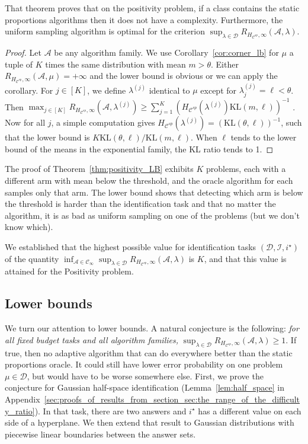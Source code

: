 \documentclass{article}
\newcommand{\KL}{\mathrm{KL}}
\begin{document}
That theorem proves that on the positivity problem, if a class contains the static proportions algorithms then it does not have a complexity. Furthermore, the uniform sampling algorithm is optimal for the criterion $\sup_{\lambda \in \mathcal D} R_{H_{\mathcal C^{sp}}, \infty}(\mathcal A, \lambda)$.

\begin{proof}
Let $\mathcal A$ be any algorithm family.
We use Corollary~\ref{cor:corner_lb} for $\mu$ a tuple of $K$ times the same distribution with mean $m > \theta$.
Either $R_{H_{\mathcal C^{sp}}, \infty}(\mathcal A, \mu) = + \infty$ and the lower bound is obvious or we can apply the corollary.
For $j \in [K]$, we define $\lambda^{(j)}$ identical to $\mu$ except for $\lambda^{(j)}_j = \ell < \theta$. Then
$
\max_{j \in [K]} R_{H_{\mathcal C^{sp}}, \infty}(\mathcal A, \lambda^{(j)})
\ge \sum_{j = 1}^K (H_{\mathcal C^{sp}}(\lambda^{(j)}) \KL(m, \ell))^{-1}$ .
Now for all $j$, a simple computation gives $H_{\mathcal C^{sp}}(\lambda^{(j)}) = (\KL(\theta, \ell))^{-1}$, such that the lower bound is $K \KL(\theta, \ell) / \KL(m, \ell)$.
When $\ell$ tends to the lower bound of the means in the exponential family, the KL ratio tends to 1.
\end{proof}

The proof of Theorem~\ref{thm:positivity_LB} exhibits $K$ problems, each with a different arm with mean below the threshold, and the oracle algorithm for each samples only that arm. The lower bound shows that detecting which arm is below the threshold is harder than the identification task and that no matter the algorithm, it is as bad as uniform sampling on one of the problems (but we don't know which).

We established that the highest possible value for identification tasks $(\mathcal D, \mathcal I, i^\star)$ of the quantity $\inf_{\mathcal A \in \mathcal C_\infty} \sup_{\lambda \in \mathcal D} R_{H_{\mathcal C^{sp}}, \infty}(\mathcal A, \lambda)$ is $K$, and that this value is attained for the Positivity problem.

\subsection{Lower bounds}
\label{sub:lower_bounds}

We turn our attention to lower bounds. A natural conjecture is the following: \emph{for all fixed budget tasks and all algorithm families,} $\sup_{\lambda \in \mathcal D} R_{H_{\mathcal C^{sp}}, \infty}(\mathcal A, \lambda) \ge 1$.
If true, then no adaptive algorithm that can do everywhere better than the static proportions oracle.
It could still have lower error probability on one problem $\mu \in \mathcal D$, but would have to be worse somewhere else.
First, we prove the conjecture for Gaussian half-space identification (Lemma~\ref{lem:half_space} in Appendix~\ref{sec:proofs_of_results_from_section_sec:the_range_of_the_difficulty_ratio}). In that task, there are two answers and $i^\star$ has a different value on each side of a hyperplane.
We then extend that result to Gaussian distributions with piecewise linear boundaries between the answer sets.
\end{document}
